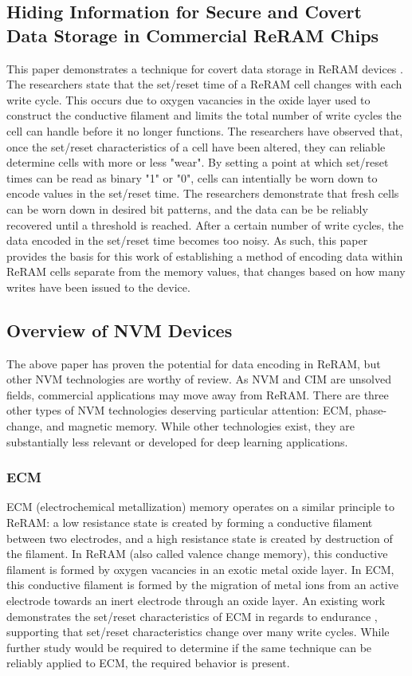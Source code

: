 \documentclass[sigconf,authoryear]{acmart}
\begin{document}
\subsection{Hiding Information for Secure and Covert Data Storage in Commercial ReRAM Chips}
This paper demonstrates a technique for covert data storage in ReRAM devices \cite{ReRAM_hiding}. The researchers state that the set/reset time of
a ReRAM cell changes with each write cycle. This occurs due to oxygen vacancies in the oxide layer used to construct the conductive
filament and limits the total number of write cycles the cell can handle before it no longer functions. The researchers have observed
that, once the set/reset characteristics of a cell have been altered, they can reliable determine cells with more or less "wear". By
setting a point at which set/reset times can be read as binary "1" or "0", cells can intentially be worn down to encode values in the
set/reset time. The researchers demonstrate that fresh cells can be worn down in desired bit patterns, and the data can be be reliably
recovered until a threshold is reached. After a certain number of write cycles, the data encoded in the set/reset time becomes too 
noisy. As such, this paper provides the basis for this work of establishing a method of encoding data within ReRAM cells separate from 
the memory values, that changes based on how many writes have been issued to the device.

\subsection{Overview of NVM Devices}
The above paper has proven the potential for data encoding in ReRAM, but other NVM technologies are worthy of review. As NVM and CIM are 
unsolved fields, commercial applications may move away from ReRAM. There are three other types of NVM technologies deserving particular 
attention: ECM, phase-change, and magnetic memory. While other technologies exist, they are substantially less relevant or developed for 
deep learning applications. 

\subsubsection{ECM} 
ECM (electrochemical metallization) memory operates on a similar principle to ReRAM: 
a low resistance state is created by forming a conductive filament between two electrodes, and a high resistance state is created by 
destruction of the filament. In ReRAM (also called valence change memory), this conductive filament is formed by oxygen vacancies 
in an exotic metal oxide layer. In ECM, this conductive filament is formed by the migration of metal ions from an active electrode
towards an inert electrode through an oxide layer. An existing work demonstrates the set/reset characteristics of ECM in regards to 
endurance \cite{ECM}, supporting that set/reset characteristics change over many write cycles. While further study would be required to 
determine if the same technique can be reliably applied to ECM, the required behavior is present.
\end{document}
